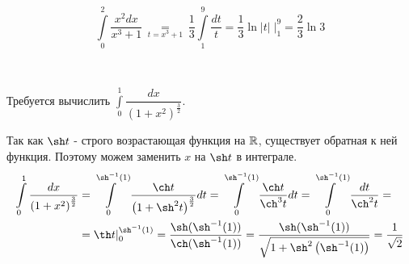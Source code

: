 \documentclass[../main.tex]{subfiles}
\begin{document}
\begin{example}
    \[ \displaystyle\int\limits_{ 0}^{ 2} \dfrac{ x^2dx}{ x^3+1} \underset{\;t=x^3+1\;}{=} \dfrac{ 1}{ 3} \displaystyle\int\limits_{ 1}^{ 9} \dfrac{ dt}{ t} = \dfrac{ 1}{ 3} \ln \left| t\right| \;|_1^9= \dfrac{ 2}{ 3} \ln 3\]
\end{example}

\begin{example}
    
    ~

    Требуется вычислить \( \displaystyle\int\limits_{ 0}^{ 1} \dfrac{ dx}{ \left( 1+x^2\right)^{ \frac{ 3}{ 2} }}\). 

    Так как \( \sh t\) - строго возрастающая функция на \( \mathbb{R} \), существует обратная к ней функция. Поэтому можем заменить \( x\) на \( \sh t\) в интеграле.  
    \begin{equation*}
        \begin{aligned}
            \displaystyle\int\limits_{ 0}^{ 1} \dfrac{ dx}{ \left( 1+x^2\right)^{ \frac{ 3}{ 2} }}&= \displaystyle\int\limits_{ 0}^{ \sh^{-1}(1)} \dfrac{ \ch t}{ \left( 1+\sh^2 t\right)^{ \frac{ 3}{ 2} }} dt=\displaystyle\int\limits_{ 0}^{ \sh^{-1}(1)} \dfrac{ \ch t}{ \ch^3 t} dt= \displaystyle\int\limits_{ 0}^{ \sh^{-1}(1)} \dfrac{ dt}{ \ch^2 t} = \\
            &=\th t |_0^{\sh^{-1}(1)}= \dfrac{ \sh(\sh^{-1}(1))}{ \ch(\sh^{-1}(1))} =\dfrac{ \sh(\sh^{-1}(1))}{ \;\sqrt[]{1+ \sh^2\left( \sh^{-1}(1)\right)}} = \dfrac{ 1}{ \;\sqrt[]{2}} 
        \end{aligned}
    \end{equation*}
\end{example}
\end{document}
